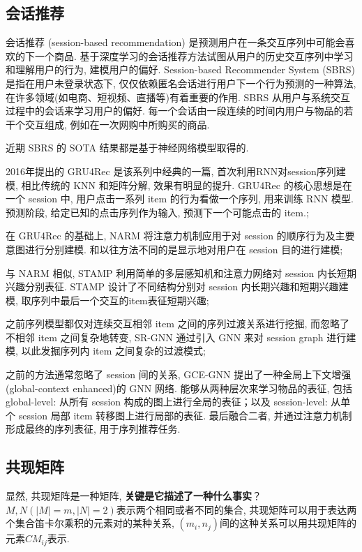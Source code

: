 \subsection{会话推荐}
会话推荐 (session-based recommendation) 是预测用户在一条交互序列中可能会喜欢的下一个商品. 基于深度学习的会话推荐方法试图从用户的历史交互序列中学习和理解用户的行为, 建模用户的偏好. Session-based Recommender System (SBRS) 是指在用户未登录状态下, 仅仅依赖匿名会话进行用户下一个行为预测的一种算法, 在许多领域(如电商、短视频、直播等)有着重要的作用. SBRS 从用户与系统交互过程中的会话来学习用户的偏好. 每一个会话由一段连续的时间内用户与物品的若干个交互组成, 例如在一次网购中所购买的商品.

近期 SBRS 的 SOTA 结果都是基于神经网络模型取得的. 
\begin{myitemize}
	\item 2016年提出的 GRU4Rec 是该系列中经典的一篇, 首次利用RNN对session序列建模, 相比传统的 KNN 和矩阵分解, 效果有明显的提升. GRU4Rec 的核心思想是在一个 session 中, 用户点击一系列 item 的行为看做一个序列, 用来训练 RNN 模型. 预测阶段, 给定已知的点击序列作为输入, 预测下一个可能点击的 item.;
	
	\item 在 GRU4Rec 的基础上, NARM 将注意力机制应用于对 session 的顺序行为及主要意图进行分别建模. 和以往方法不同的是显示地对用户在 session 目的进行建模;
	
	\item 与 NARM 相似, STAMP 利用简单的多层感知机和注意力网络对 session 内长短期兴趣分别表征. STAMP 设计了不同结构分别对 session 内长期兴趣和短期兴趣建模, 取序列中最后一个交互的item表征短期兴趣;
	
	\item 之前序列模型都仅对连续交互相邻 item 之间的序列过渡关系进行挖掘, 而忽略了不相邻 item 之间复杂地转变, SR-GNN 通过引入 GNN 来对 session graph 进行建模, 以此发掘序列内 item 之间复杂的过渡模式;
	
	\item 之前的方法通常忽略了 session 间的关系, GCE-GNN 提出了一种全局上下文增强(global-context enhanced)的 GNN 网络. 能够从两种层次来学习物品的表征, 包括 global-level: 从所有 session 构成的图上进行全局的表征；以及 session-level: 从单个 session 局部 item 转移图上进行局部的表征. 最后融合二者, 并通过注意力机制形成最终的序列表征, 用于序列推荐任务.
\end{myitemize}

\subsection{共现矩阵}
显然, 共现矩阵是一种矩阵, \textbf{关键是它描述了一种什么事实}？$M, N(|M| = m, |N| = 2)$表示两个相同或者不同的集合, 共现矩阵可以用于表达两个集合笛卡尔乘积的元素对的某种关系, $(m_i, n_j)$间的这种关系可以用共现矩阵的元素$CM_{ij}$表示. 

